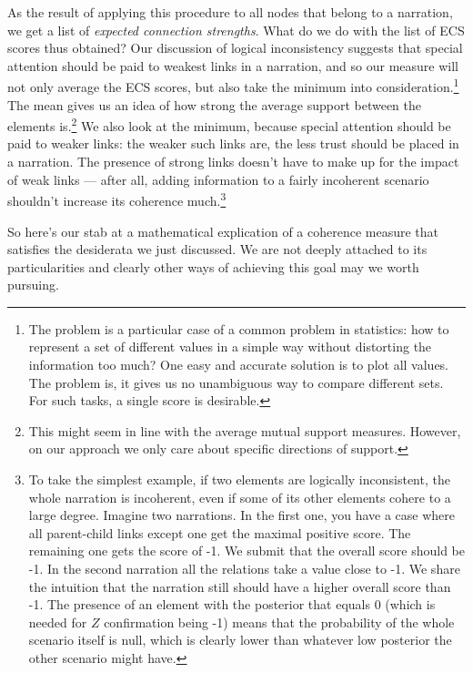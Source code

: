 \documentclass[10pt,]{scrartcl}
\begin{document}
 As the result of applying this procedure to all  nodes that belong to a narration, we get a list of \textit{expected connection strengths}. What do we do with the list of \textsf{ECS} scores thus obtained? Our discussion of logical inconsistency suggests that special attention should be paid to weakest links in a narration, and so our measure will  not only average the ECS scores, but also take the minimum into consideration.\footnote{The problem is a particular case of a common problem in statistics: how
to represent a set of different values in a simple way without
distorting the information too much? One easy and accurate solution is
to plot all values. The problem is, it gives us no unambiguous way to
compare different sets. For such tasks, a single score is desirable.} The
mean gives us an idea of how strong the average support between the
elements is.\footnote{This might seem  in line with the average mutual support
measures. However, on our approach we only care about specific directions of support.}  We also look at the minimum, because special attention should be paid to weaker links: the
weaker such links are, the less trust should be placed in a narration.
The presence of strong links doesn't have to make up for the impact of weak
links --- after all, adding information to a fairly incoherent scenario shouldn't increase its coherence much.\footnote{To
take the simplest example, if two elements are logically inconsistent, the whole narration is incoherent, even if some of its other elements cohere to a large degree. Imagine two narrations. In the first one, you have a case where all
parent-child links except one get the maximal positive score. The
remaining one gets the score of -1. We submit that the overall score
should be -1. In the second narration all the relations take a value
close to -1. We share the intuition that the narration still should have
a higher overall score than -1. The presence of an element with the
posterior that equals 0 (which is needed for \(Z\) confirmation being
-1) means that the probability of the whole scenario itself is null, which is clearly lower than whatever low posterior the other scenario might have.}






So here's our stab at a mathematical explication of a coherence measure
that satisfies the desiderata we just discussed. We are not deeply
attached to its particularities and clearly other ways of achieving this
goal may we worth pursuing.
\end{document}
